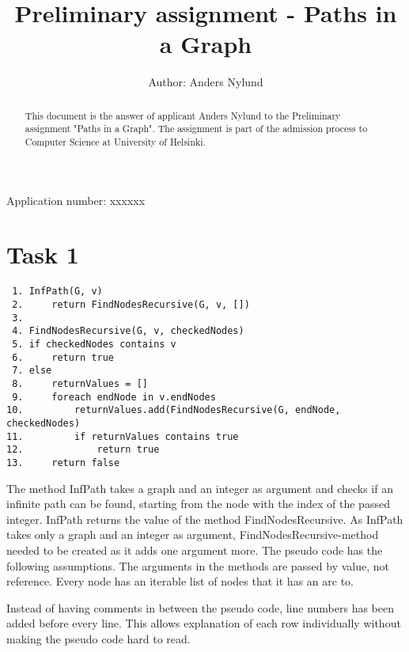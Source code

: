 \documentclass[]{article}
\title{Preliminary assignment - Paths in a Graph}
\author{Author: Anders Nylund}
\begin{document}
\maketitle

\begin{center}
	Application number: xxxxxx
\end{center}

\begin{abstract}
This document is the answer of applicant Anders Nylund to the Preliminary assignment "Paths in a Graph". The assignment is part of the admission process to Computer Science at University of Helsinki.
\end{abstract}

\newpage
\section*{Task 1}

\begin{lstlisting}
 1.	InfPath(G, v)
 2.		return FindNodesRecursive(G, v, [])
 3.
 4.	FindNodesRecursive(G, v, checkedNodes)
 5.	if checkedNodes contains v
 6.		return true
 7.	else
 8.		returnValues = []
 9.		foreach endNode in v.endNodes
10.			returnValues.add(FindNodesRecursive(G, endNode, checkedNodes)
11.			if returnValues contains true
12.				return true
13.		return false
\end{lstlisting}

The method InfPath takes a graph and an integer as argument and checks if an infinite path can be found, starting from
the node with the index of the passed integer. InfPath returns the value of the method FindNodesRecursive.
As InfPath takes only a graph and an integer as argument, FindNodesRecursive-method needed to be created as it adds
one argument more.  The pseudo code has the following assumptions. The arguments in the methods are passed by value, not reference. Every node has an iterable list of nodes that it has an arc to.

Instead of having comments in between the pseudo code, line numbers has been added before every line. This allows explanation of each row individually without making the pseudo code hard to read.
\end{document}
